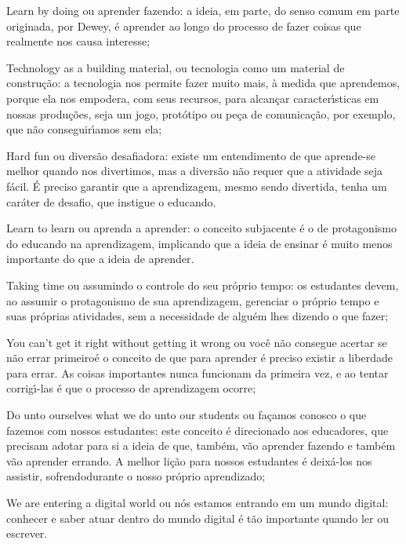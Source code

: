 \documentclass[
12pt,		%
openright,	%
twoside,  %
a4paper,			%
chapter=TITLE,		%
english,			%
french,				%
spanish,			%
brazil				%
]{USPSC-classe/USPSC}
\begin{document}
\begin{alineas}
\item Learn by doing ou aprender fazendo: a ideia, em parte,  do senso comum em parte originada, por Dewey, \'e aprender ao longo do processo de fazer coisas que realmente nos causa interesse;
\item Technology as a building material, ou \textquotedbl tecnologia como um material de constru\c{c}\~ao\textquotedbl : a tecnologia nos permite fazer muito mais, \`a medida que aprendemos, porque ela nos empodera, com seus recursos, para alcan\c{c}ar caracter\'{\i}sticas em nossas produ\c{c}\~oes, seja um jogo, prot\'otipo ou pe\c{c}a de comunica\c{c}\~ao, por exemplo, que n\~ao conseguir\'{\i}amos sem ela;
\item Hard fun ou \textquotedbl divers\~ao desafiadora\textquotedbl : existe um entendimento de que aprende-se melhor quando nos divertimos, mas a divers\~ao n\~ao requer que a atividade seja f\'acil. \'E preciso garantir que a aprendizagem, mesmo sendo divertida, tenha um car\'ater de desafio, que instigue o educando.
\item Learn to learn ou \textquotedbl aprenda a aprender\textquotedbl : o conceito subjacente \'e o de protagonismo do educando na aprendizagem, implicando que a ideia de ensinar \'e muito menos importante do que a ideia de aprender.
\item Taking time ou \textquotedbl assumindo o controle do seu pr\'oprio tempo\textquotedbl : os estudantes devem, ao assumir o protagonismo de sua aprendizagem, gerenciar o pr\'oprio tempo e suas pr\'oprias atividades, sem a necessidade de algu\'em lhes dizendo o que fazer;
\item You can’t get it right without getting it wrong ou \textquotedbl voc\^e n\~ao consegue acertar
se n\~ao errar primeiro\textquotedbl \'e o conceito de que para aprender \'e preciso existir a
liberdade para errar. As coisas importantes nunca funcionam da primeira vez, e ao tentar corrig\'{\i}-las \'e que o processo de aprendizagem ocorre;
\item Do unto ourselves what we do unto our students ou \textquotedbl fa\c{c}amos conosco o que fazemos com nossos estudantes\textquotedbl : este conceito \'e direcionado aos educadores, que precisam adotar para si a ideia de que, tamb\'em, v\~ao aprender fazendo e tamb\'em v\~ao aprender errando. A melhor li\c{c}\~ao para nossos estudantes \'e deix\'a-los nos assistir, \textquotedbl sofrendo\textquotedbl  durante o nosso pr\'oprio aprendizado;
\item We are entering a digital world ou \textquotedbl n\'os estamos entrando em um mundo digital\textquotedbl : conhecer e saber atuar dentro do mundo digital \'e t\~ao importante quando ler ou escrever.
\end{alineas}
\end{document}
